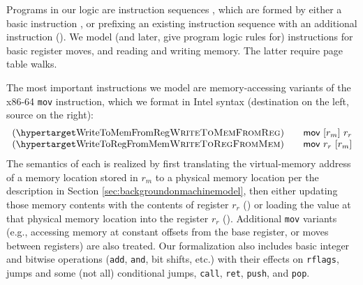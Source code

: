 Programs in our logic are instruction sequences \instrs, which are formed by either a basic instruction \iskip, or prefixing an existing instruction
sequence with an additional instruction (\iseq\instr\instrs).
We model (and later, give program logic rules for) instructions for basic register moves, and reading and writing memory.
The latter require page table walks.


The most important instructions we model are memory-accessing variants of the x86-64 \lstinline|mov| instruction, which we format in Intel syntax
(destination on the left, source on the right):
\[
\begin{array}{l}
  \hbox{(\TirNameStyle{WriteToMemFromReg})} \qquad
  \textsf{mov}~[r_m]~r_r \\
  \hbox{(\TirNameStyle{WriteToRegFromMem})} \qquad 
  \textsf{mov}~r_r~[r_m]
  \end{array}
  \]
The semantics of each is realized by first translating the virtual-memory address of a memory location stored in $r_m$ to a physical memory location
per the description in Section \ref{sec:backgroundonmachinemodel},
then either updating those memory contents with the contents of register $r_r$ () 
or loading the value at that physical memory location into the register $r_r$
(). 
Additional \lstinline|mov| variants (e.g., accessing memory at constant offsets from the base register, or moves between registers) are also treated.
Our formalization also includes basic integer and bitwise operations (\lstinline|add|,
\lstinline|and|, bit shifts, etc.) with their effects on \lstinline|rflags|, jumps and some (not all) conditional jumps, \lstinline|call|, \lstinline|ret|, \lstinline|push|,
and \lstinline|pop|.
